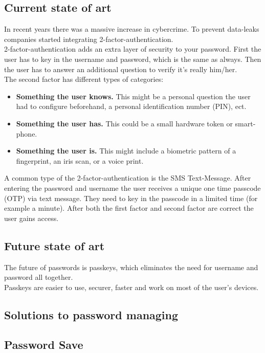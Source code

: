 \documentclass[conference]{IEEEtran}
\begin{document}
\subsection{Current state of art}
In recent years there was a massive increase in cybercrime. To prevent data-leaks companies started integrating 2-factor-authentication.\\
2-factor-authentication adds an extra layer of security to your password. First the user has to key in the username and password, which is the same as always. Then the user has to answer an additional question to verify it's really him/her.\\
The second factor has different types of categories:
\begin{itemize}
\item \textbf{Something the user knows.}  This might be a personal question the user had to configure beforehand, a personal identification number (PIN), ect.
\item \textbf{Something the user has.} This could be a small hardware token or smart-phone.
\item \textbf{Something the user is.} This might include a  biometric pattern of a fingerprint, an iris scan, or a voice print. 
\end{itemize}
A common type of the 2-factor-authentication is the SMS Text-Message. After entering the password and username the user receives a unique one time passcode (OTP) via text message. They need to key in the passcode in a limited time (for example a minute). After both the first factor and second factor are correct the user gains access.
                                                                                               
\subsection{Future state of art}
The future of passwords is passkeys, which eliminates the need for username and password all together.\\

Passkeys are easier to use, securer, faster and work on most of the user's devices.
\subsection{Solutions to password managing}

\subsection{Password Save}
\end{document}
